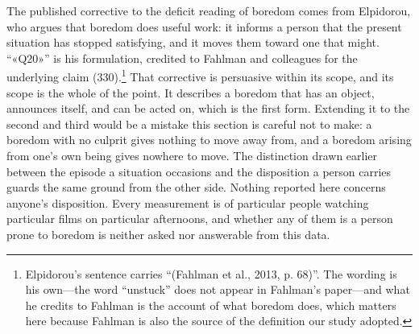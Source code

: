 The published corrective to the deficit reading of boredom comes from Elpidorou, who argues
that boredom does useful work: it informs a person that the present situation has stopped
satisfying, and it moves them toward one that might. ``«Q20»'' is his formulation, credited to
Fahlman and colleagues for the underlying claim (330).\footnote{Elpidorou's sentence carries
``(Fahlman et al., 2013, p. 68)''. The wording is his own---the word ``unstuck'' does not appear
in Fahlman's paper---and what he credits to Fahlman is the account of what boredom does, which
matters here because Fahlman is also the source of the definition our study adopted.} That
corrective is persuasive within its scope, and its scope is the whole of the point. It describes
a boredom that has an object, announces itself, and can be acted on, which is the first form.
Extending it to the second and third would be a mistake this section is careful not to make: a
boredom with no culprit gives nothing to move away from, and a boredom arising from one's own
being gives nowhere to move. The distinction drawn earlier between the episode a situation
occasions and the disposition a person carries guards the same ground from the other side.
Nothing reported here concerns anyone's disposition. Every measurement is of particular people
watching particular films on particular afternoons, and whether any of them is a person prone
to boredom is neither asked nor answerable from this data.
